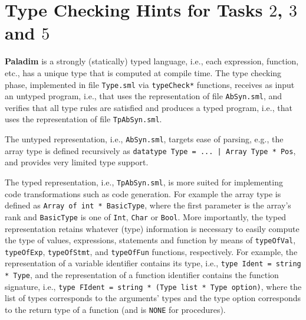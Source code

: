 \documentclass[12pt,a4paper]{article}
\newcommand{\paladim}{\textbf{Paladim}\xspace}
\begin{document}
{%
\newpage
\appendix

\nocite{PattersonHennessy}
\nocite{Torben2011}
\nocite{MipsModule}


\renewcommand{\refname}{\section{Reading Material}}


%



\section{Type Checking Hints for Tasks $2$, $3$ and $5$}
\label{sec:task3hints}

\paladim is a strongly (statically) typed language, i.e., each expression,
function, etc., has a unique type that is computed at compile time.
The type checking phase, implemented in file {\tt Type.sml} via 
{\tt typeCheck*} functions, receives as input an untyped program, i.e., 
that uses the representation of file {\tt AbSyn.sml}, and verifies 
that all type rules are satisfied and produces a typed program, 
i.e., that uses the representation of file {\tt TpAbSyn.sml}.

The untyped representation, i.e., {\tt AbSyn.sml}, targets ease of 
parsing, e.g., the array type is defined recursively as  
{\tt datatype Type = ... | Array Type * Pos}, and provides
very limited type support.

The typed representation, i.e., {\tt TpAbSyn.sml}, is more suited 
for implementing code transformations such as code generation.
For example the array type is defined as
{\tt Array of int * BasicType}, where the first parameter is the
array's rank and {\tt BasicType} is one of {\tt Int}, {\tt Char} 
or {\tt Bool}.   
%
More importantly, the typed representation retains whatever
(type) information is necessary to easily compute the type
of values, expressions, statements and function by means of 
{\tt typeOfVal}, {\tt typeOfExp}, {\tt typeOfStmt}, 
and {\tt typeOfFun} functions, respectively.
%
For example, the representation of a variable identifier contains its type,
i.e., {\tt type Ident = string * Type}, and the representation of a function 
identifier contains the function signature,
i.e., {\tt type FIdent = string * (Type list * Type option)}, 
where the list of types corresponds to the arguments' types and
the type option corresponds to the return type of a function 
(and is {\tt NONE} for procedures).


}
\end{document}
